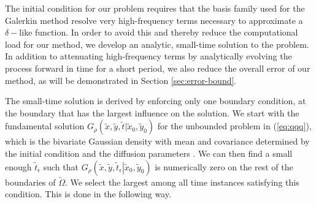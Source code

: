 The initial condition for our problem requires that the basis family
used for the Galerkin method resolve very high-frequency terms
necessary to approximate a $\delta-$like function. In order to avoid this
and thereby reduce the computational load for our method, we develop
an analytic, small-time solution to the problem. In addition to
attenuating high-frequency terms by analytically evolving the process
forward in time for a short period, we also reduce the overall error
of our method, as will be demonstrated in Section
\ref{sec:error-bound}.

The small-time solution is derived by enforcing only one boundary
condition, at the boundary that has the largest influence on the
solution. We start with the fundamental solution
$G_\rho(\tilde{x},\tilde{y},\tilde{t} | \tilde{x}_0, \tilde{y}_0)$ for
the unbounded problem in (\ref{eq:qqq}), which is the bivariate
Gaussian density with mean and covariance determined by the initial
condition and the diffusion parameters \cite{stakgold2011green}. We
can then find a small enough $\tilde{t}_\epsilon$ such that
$G_\rho\left(\tilde{x},\tilde{y}, \tilde{t}_\epsilon \left|
    \tilde{x}_0, \tilde{y}_0 \right.\right)$ is numerically zero on
the rest of the boundaries of $\tilde{\Omega}$. We select the largest
among all time instances satisfying this condition. This is done in
the following way.
